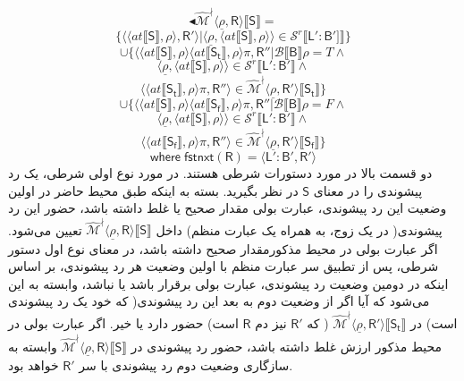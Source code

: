 $$\blacktriangleleft\mathcal{\hat{M}^\nmid} \langle \underline{\rho},\mathsf{R} \rangle \llbracket \mathsf{S} \rrbracket=$$
$$\{\langle \langle at \llbracket \mathsf{S} \rrbracket , \rho \rangle , \mathsf{R'} \rangle | \langle \underline{\rho} , \langle at \llbracket \mathsf{S} \rrbracket , \rho \rangle \rangle \in \mathcal{S}^r \llbracket \mathsf{L':B'} ]\rrbracket \}$$
$$\cup \{\langle \langle at \llbracket \mathsf{S} \rrbracket , \rho \rangle \langle at \llbracket \mathsf{S_t} \rrbracket, \rho \rangle \pi, \mathsf{R''} | \mathcal{B}\llbracket\mathsf{B} \rrbracket \rho = \mathit{T} \land$$
$$\langle \underline{\rho},\langle at \llbracket \mathsf{S} \rrbracket , \rho \rangle \rangle \in \mathcal{S}^r \llbracket \mathsf{L':B'} \rrbracket \land$$
$$\langle \langle at \llbracket \mathsf{S_t} \rrbracket , \rho \rangle \pi,\mathsf{R''} \rangle \in \mathcal{\hat{M}^\nmid} \langle \underline{\rho}, \mathsf{R'} \rangle  \llbracket \mathsf{S_t} \rrbracket \}$$
$$\cup \{\langle \langle at \llbracket \mathsf{S} \rrbracket , \rho \rangle \langle at \llbracket \mathsf{S_f} \rrbracket, \rho \rangle \pi, \mathsf{R''} | \mathcal{B}\llbracket\mathsf{B} \rrbracket \rho = \mathit{F} \land$$
$$\langle \underline{\rho},\langle at \llbracket \mathsf{S} \rrbracket , \rho \rangle \rangle \in \mathcal{S}^r \llbracket \mathsf{L':B'} \rrbracket \land$$
$$\langle \langle at \llbracket \mathsf{S_f} \rrbracket , \rho \rangle \pi,\mathsf{R''} \rangle \in \mathcal{\hat{M}^\nmid}  \langle \underline{\rho}, \mathsf{R'} \rangle \llbracket \mathsf{S_f} \rrbracket \}$$
$$\mathsf{where\; fstnxt(R)=\langle L':B', R' \rangle}$$
دو قسمت بالا در مورد دستورات شرطی هستند. در مورد نوع اولی شرطی، یک رد پیشوندی را در معنای $\mathsf{S}$ در نظر بگیرید. بسته به اینکه طبق محیط حاضر در اولین وضعیت این رد پیشوندی، عبارت بولی مقدار صحیح یا غلط داشته باشد، حضور این رد پیشوندی( در یک زوج، به همراه یک عبارت منظم) داخل 
$\mathcal{\hat{M}^\nmid} \langle \underline{\rho},\mathsf{R} \rangle \llbracket \mathsf{S} \rrbracket$
تعیین می‌شود. اگر عبارت بولی در محیط مذکورمقدار صحیح داشته باشد، 
در معنای نوع اول دستور شرطی، پس از تطبیق سر عبارت منظم با اولین وضعیت هر رد پیشوندی، بر اساس اینکه در دومین وضعیت رد پیشوندی، عبارت بولی برقرار باشد یا نباشد، وابسته به این می‌شود که آیا اگر از وضعیت دوم به بعد این رد پیشوندی( که خود یک رد پیشوندی است) در 
$\mathcal{\hat{M}^\nmid} \langle \underline{\rho},\mathsf{R'} \rangle \llbracket \mathsf{S_t} \rrbracket$
( که $\mathsf{R'}$ نیز دم $\mathsf{R}$ است) حضور دارد یا خیر. اگر عبارت بولی در محیط مذکور ارزش غلط داشته باشد، حضور رد پیشوندی در
$\mathcal{\hat{M}^\nmid} \langle \underline{\rho},\mathsf{R} \rangle \llbracket \mathsf{S} \rrbracket$
وابسته به سازگاری وضعیت دوم رد پیشوندی با سر $\mathsf{R'}$ خواهد بود.

